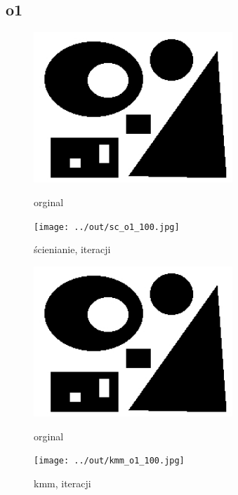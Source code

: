\documentclass[a4paper,12pt]{article}
\begin{document}
\newpage
\subsection{o1}

\begin{figure}[h!]
\begin{minipage}[t]{7.5cm}
\begin{center}
\includegraphics[width=7.5cm]{../in/o1.jpg}
\caption{orginal}
\end{center}
\end{minipage}
\hfill
\begin{minipage}[t]{7.5cm}
\begin{center}
\texttt{[image: ../out/sc\_o1\_100.jpg]}
\caption{ścienianie, \protect iteracji}
\end{center}
\end{minipage}
\end{figure}

\begin{figure}[h!]
\begin{minipage}[t]{7.5cm}
\begin{center}
\includegraphics[width=7.5cm]{../in/o1.jpg}
\caption{orginal}
\end{center}
\end{minipage}
\hfill
\begin{minipage}[t]{7.5cm}
\begin{center}
\texttt{[image: ../out/kmm\_o1\_100.jpg]}
\caption{kmm, \protect iteracji}
\end{center}
\end{minipage}
\end{figure}
\end{document}
